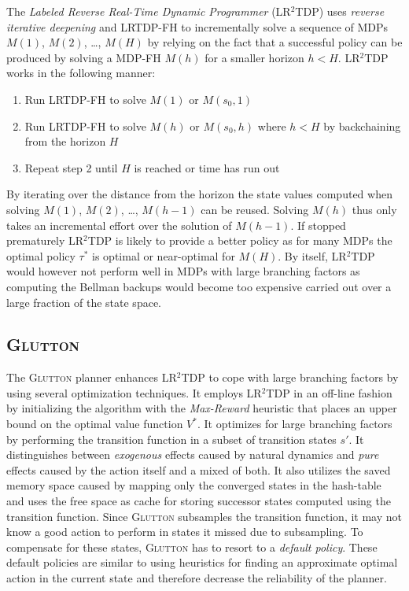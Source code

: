 \documentclass[runningheads,a4paper]{llncs}
\begin{document}
The \emph{Labeled Reverse Real-Time Dynamic Programmer} (LR$^2$TDP) uses \emph{reverse iterative deepening} and LRTDP-FH to incrementally solve a sequence of MDPs $M(1)$, $M(2)$, \ldots , $M(H)$ by relying on the fact that a successful policy can be produced by solving a MDP-FH $M(h)$ for a smaller horizon $h < H$. LR$^2$TDP works in the following manner:

\begin{enumerate}
	\item Run LRTDP-FH to solve $M(1)$ or $M(s_0, 1)$
	\item Run LRTDP-FH to solve $M(h)$ or $M(s_0, h)$ where $h < H$ by backchaining from the horizon $H$
	\item Repeat step 2 until $H$ is reached or time has run out
\end{enumerate}
By iterating over the distance from the horizon the state values computed when solving $M(1)$, $M(2)$, \ldots, $M(h-1)$ can be reused. Solving $M(h)$ thus only takes an incremental effort over the solution of $M(h-1)$. If stopped prematurely LR$^2$TDP is likely to provide a better policy as for many MDPs the optimal policy $\tau^*$ is optimal or near-optimal for $M(H)$. By itself, LR$^2$TDP would however not perform well in MDPs with large branching factors as computing the Bellman backups would become too expensive carried out over a large fraction of the state space.

\subsection{\textsc{Glutton}}
The \textsc{Glutton} planner enhances LR$^2$TDP to cope with large branching factors by using several optimization techniques. It employs LR$^2$TDP in an off-line fashion by initializing the algorithm with the \emph{Max-Reward} heuristic that places an upper bound on the optimal value function $V^*$. It optimizes for large branching factors by performing the transition function in a subset of transition states $s'$. It distinguishes between \emph{exogenous} effects caused by natural dynamics and \emph{pure} effects caused by the action itself and a mixed of both. It also utilizes the saved memory space caused by mapping only the converged states in the hash-table and uses the free space as cache for storing successor states computed using the transition function.
Since \textsc{Glutton} subsamples the transition function, it may not know a good action to perform in states it missed due to subsampling. To compensate for these states, \textsc{Glutton} has to resort to a \emph{default policy}. These default policies are similar to using heuristics for finding an approximate optimal action in the current state and therefore decrease the reliability of the planner.
\end{document}
